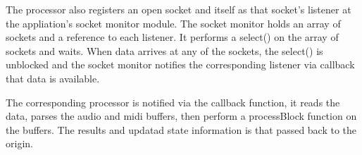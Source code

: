 The processor also registers an open socket and itself as that socket's listener at the appliation's socket monitor module. The socket monitor holds an array of sockets and a reference to each listener. It performs a select() on the array of sockets and waits. When data arrives at any of the sockets, the select() is unblocked and the socket monitor notifies the corresponding listener via callback that data is available.

The corresponding processor is notified via the callback function, it reads the data, parses the audio and midi buffers, then perform a processBlock function on the buffers. The results and updatad state information is that passed back to the origin.

